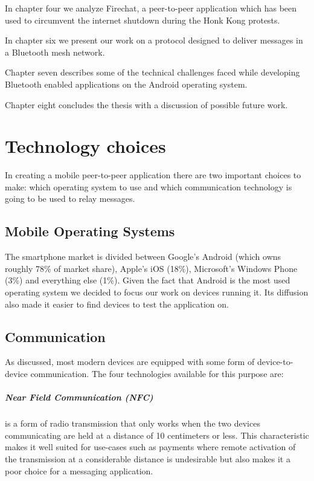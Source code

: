 In chapter four we analyze Firechat, a peer-to-peer application which has been used to circumvent the internet shutdown during the Honk Kong protests.

In chapter six we present our work on a protocol designed to deliver messages in a Bluetooth mesh network.

Chapter seven describes some of the technical challenges faced while developing Bluetooth enabled applications on the Android operating system.

Chapter eight concludes the thesis with a discussion of possible future work.

\chapter{Technology choices}
In creating a mobile peer-to-peer application there are two important choices to make: which operating system to use and which communication technology is going to be used to relay messages.

\section{Mobile Operating Systems}
The smartphone market is divided between Google's Android (which owns roughly 78\% of market share), Apple's iOS (18\%), Microsoft's Windows Phone (3\%) and everything else (1\%).
Given the fact that Android is the most used operating system we decided to focus our work on devices running it.
Its diffusion also made it easier to find devices to test the application on.

\section{Communication}
As discussed, most modern devices are equipped with some form of device-to-device communication.
The four technologies available for this purpose are:

\paragraph{Near Field Communication (NFC)}
is a form of radio transmission that only works when the two devices communicating are held at a distance of 10 centimeters or less. 
This characteristic makes it well suited for use-cases such as payments where remote activation of the transmission at a considerable distance is undesirable but also makes it a poor choice for a messaging application.

